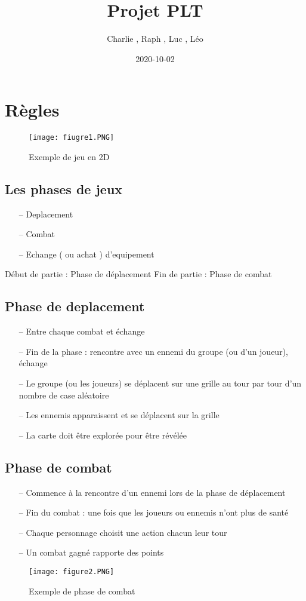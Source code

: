 \documentclass{article}
\author{Charlie , Raph , Luc , Léo}
\title{Projet PLT}
\date{2020-10-02}
\begin{document}
 \maketitle
 \newpage
\tableofcontents
\newpage
\listoffigures
\newpage
\section{Règles}
\begin{figure}[!ht]
\begin{center}
\texttt{[image: fiugre1.PNG]}
\end{center}
\caption{Exemple de jeu en 2D}
\label{Exemple de jeu en 2D}
\end{figure}
\subsection{Les phases de jeux}
\begin{itemize}
\item [--]Deplacement
\item [--]Combat
\item [--]Echange ( ou achat ) d'equipement
\end{itemize}
Début de partie : Phase de déplacement
Fin de partie : Phase de combat
\subsection{Phase de deplacement}
\begin{itemize}
\item [--]Entre chaque combat et échange
\item [--]Fin de la phase : rencontre avec un ennemi du groupe (ou d’un joueur), échange
\item [--]Le groupe (ou les joueurs) se déplacent sur une grille au tour par tour d’un nombre de case aléatoire
\item [--]Les ennemis apparaissent et se déplacent sur la grille
\item [--] La carte doit être explorée pour être révélée
\end{itemize}
\subsection{Phase de combat}
\begin{itemize}
\item [--]Commence à la rencontre d’un ennemi lors de la phase de déplacement
\item [--]Fin du combat : une fois que les joueurs ou ennemis n’ont plus de santé
\item [--]Chaque personnage choisit une action chacun leur tour
\item [--]Un combat gagné rapporte des points
\end{itemize}
\begin{figure}[!ht]
\begin{center}
\texttt{[image: figure2.PNG]}
\end{center}
\caption{Exemple de phase de combat}
\label{Exemple de phase de combat}
\end{figure}
\end{document}
